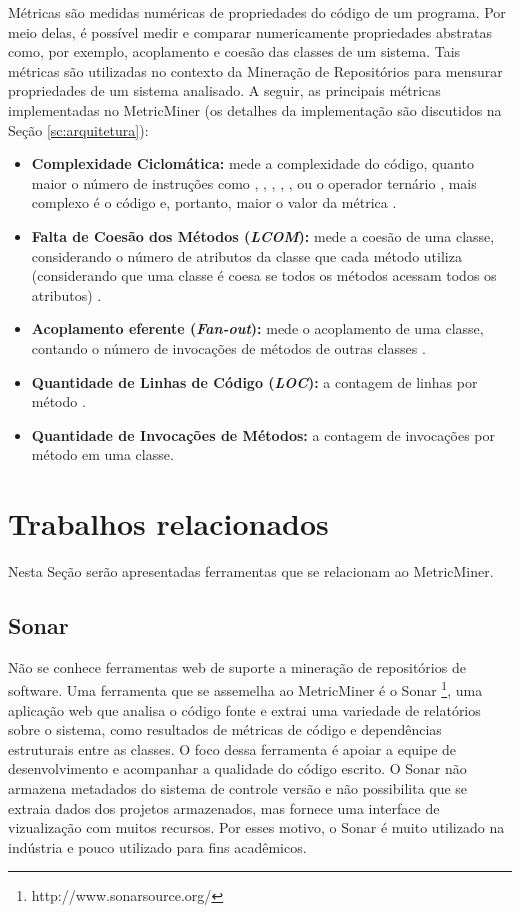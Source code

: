 \documentclass[a4paper, 12pt, twoside]{book}
\newcommand{\codechunk}[1]{{\ttfamily {\small #1}}}
\begin{document}
    Métricas são medidas numéricas de propriedades do código de um programa. Por meio delas, é possível medir e comparar numericamente propriedades abstratas como, por exemplo, acoplamento e coesão das classes de um sistema. Tais métricas são utilizadas no contexto da Mineração de Repositórios para mensurar propriedades de um sistema analisado. A seguir, as principais métricas implementadas no MetricMiner (os detalhes da implementação são discutidos na Seção \ref{sc:arquitetura}):

    \begin{itemize} 
        \item \textbf{Complexidade Ciclomática:} mede a complexidade do código, quanto maior o número de instruções como \codechunk{if}, \codechunk{while}, \codechunk{case}, \codechunk{\&\&}, \codechunk{||}, ou o operador ternário \codechunk{?}, mais complexo é o código e, portanto, maior o valor da métrica \cite{maccabe:76}.
        \item \textbf{Falta de Coesão dos Métodos (\textit{LCOM}):} mede a coesão de uma classe, considerando o número de atributos da classe que cada método utiliza (considerando que uma classe é coesa se todos os métodos acessam todos os atributos) \cite{henderson:96}.
        \item \textbf{Acoplamento eferente (\textit{Fan-out}):} mede o acoplamento de uma classe, contando o número de invocações de métodos de outras classes \cite{lorenz:94}.
        \item \textbf{Quantidade de Linhas de Código (\textit{LOC}):} a contagem de linhas por método \cite{chidamber:94}.
        \item \textbf{Quantidade de Invocações de Métodos:} a contagem de invocações por método \cite{li:93} em uma classe.
    \end{itemize}

\chapter{Trabalhos relacionados} \label{ch:trabalhos}

Nesta Seção serão apresentadas ferramentas que se relacionam ao MetricMiner.

\section*{Sonar}
    Não se conhece ferramentas web de suporte a mineração de repositórios de software. Uma ferramenta que se assemelha ao MetricMiner é o Sonar \footnote{http://www.sonarsource.org/}, uma aplicação web que analisa o código fonte e extrai uma variedade de relatórios sobre o sistema, como resultados de métricas de código e dependências estruturais entre as classes. O foco dessa ferramenta é apoiar a equipe de desenvolvimento e acompanhar a qualidade do código escrito. O Sonar não armazena metadados do sistema de controle versão e não possibilita que se extraia dados dos projetos armazenados, mas fornece uma interface de vizualização com muitos recursos. Por esses motivo, o Sonar é muito utilizado na indústria e pouco utilizado para fins acadêmicos.
    
\end{document}
